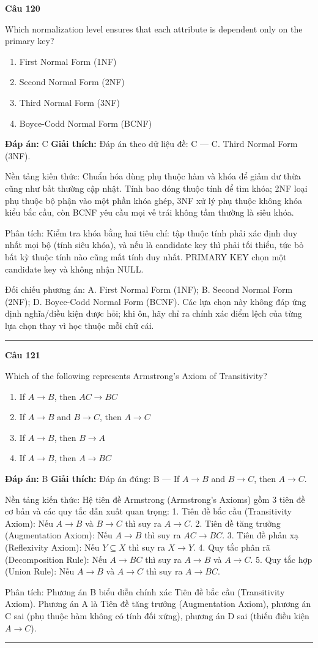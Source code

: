 \documentclass[11pt,a4paper]{article}
\newenvironment{question}[1]{%
  \par\vspace{1em}\noindent\textbf{\large Câu #1}\par\vspace{0.4em}
}{%
  \par\vspace{1em}\hrule\vspace{0.6em}
}
\newenvironment{choices}{%
  \begin{enumerate}[label=\textbf{\Alph*.},leftmargin=2.2em,itemsep=2pt,topsep=3pt]
}{%
  \end{enumerate}
}
\newcommand{\choice}{\item}
\begin{document}
\begin{question}{120}
Which normalization level ensures that each attribute is dependent only on the primary key?
\begin{choices}
\choice First Normal Form (1NF)
\choice Second Normal Form (2NF)
\choice Third Normal Form (3NF)
\choice Boyce-Codd Normal Form (BCNF)
\end{choices}
\textbf{Đáp án:} C
\textbf{Giải thích:} Đáp án theo dữ liệu đề: C — C. Third Normal Form (3NF).

Nền tảng kiến thức: Chuẩn hóa dùng phụ thuộc hàm và khóa để giảm dư thừa cũng như bất thường cập nhật. Tính bao đóng thuộc tính để tìm khóa; 2NF loại phụ thuộc bộ phận vào một phần khóa ghép, 3NF xử lý phụ thuộc không khóa kiểu bắc cầu, còn BCNF yêu cầu mọi vế trái không tầm thường là siêu khóa.

Phân tích: Kiểm tra khóa bằng hai tiêu chí: tập thuộc tính phải xác định duy nhất mọi bộ (tính siêu khóa), và nếu là candidate key thì phải tối thiểu, tức bỏ bất kỳ thuộc tính nào cũng mất tính duy nhất. PRIMARY KEY chọn một candidate key và không nhận NULL.

Đối chiếu phương án: A. First Normal Form (1NF); B. Second Normal Form (2NF); D. Boyce-Codd Normal Form (BCNF). Các lựa chọn này không đáp ứng định nghĩa/điều kiện được hỏi; khi ôn, hãy chỉ ra chính xác điểm lệch của từng lựa chọn thay vì học thuộc mỗi chữ cái.
\end{question}


\begin{question}{121}
Which of the following represents Armstrong's Axiom of Transitivity?
\begin{choices}
\choice If $A \to B$, then $AC \to BC$
\choice If $A \to B$ and $B \to C$, then $A \to C$
\choice If $A \to B$, then $B \to A$
\choice If $A \to B$, then $A \to BC$
\end{choices}
\textbf{Đáp án:} B
\textbf{Giải thích:} Đáp án đúng: B — If $A \to B$ and $B \to C$, then $A \to C$.

Nền tảng kiến thức: Hệ tiên đề Armstrong (Armstrong's Axioms) gồm 3 tiên đề cơ bản và các quy tắc dẫn xuất quan trọng:
1. Tiên đề bắc cầu (Transitivity Axiom): Nếu $A \to B$ và $B \to C$ thì suy ra $A \to C$.
2. Tiên đề tăng trưởng (Augmentation Axiom): Nếu $A \to B$ thì suy ra $AC \to BC$.
3. Tiên đề phản xạ (Reflexivity Axiom): Nếu $Y \subseteq X$ thì suy ra $X \to Y$.
4. Quy tắc phân rã (Decomposition Rule): Nếu $A \to BC$ thì suy ra $A \to B$ và $A \to C$.
5. Quy tắc hợp (Union Rule): Nếu $A \to B$ và $A \to C$ thì suy ra $A \to BC$.

Phân tích: Phương án B biểu diễn chính xác Tiên đề bắc cầu (Transitivity Axiom). Phương án A là Tiên đề tăng trưởng (Augmentation Axiom), phương án C sai (phụ thuộc hàm không có tính đối xứng), phương án D sai (thiếu điều kiện $A \to C$).
\end{question}
\end{document}
